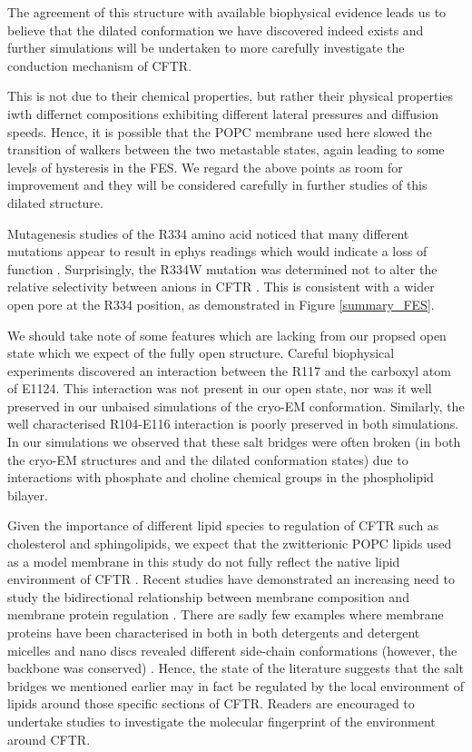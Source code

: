 The agreement of this structure with available biophysical evidence leads us to believe that the dilated conformation we have discovered indeed exists and further simulations will be undertaken to more carefully investigate the conduction mechanism of CFTR. 

This is not due to their chemical properties, but rather their physical properties iwth differnet compositions exhibiting different lateral pressures and diffusion speeds. Hence, it is possible that the POPC membrane used here slowed the transition of walkers between the two metastable states, again leading to some levels of hysteresis in the FES. We regard the above points as room for improvement and they will be considered carefully in further studies of this dilated structure.

Mutagenesis studies of the R334 amino acid noticed that many different mutations appear to result in ephys readings which would indicate a loss of function \cite{ge2004, gong2004, linsdell2021}. Surprisingly, the R334W mutation was determined not to alter the relative selectivity between anions in CFTR \cite{sheppard1993}. This is consistent with a wider open pore at the R334 position, as demonstrated in Figure \ref{summary_FES}.


We should take note of some features which are lacking from our propsed open state which we expect of the fully open structure. Careful biophysical experiments discovered an interaction between the R117 and the carboxyl atom of E1124. This interaction was not present in our open state, nor was it well preserved in our unbaised simulations of the cryo-EM conformation. Similarly, the well characterised R104-E116 interaction is poorly preserved in both simulations. In our simulations we observed that these salt bridges were often broken (in both the cryo-EM structures and and the dilated conformation  states) due to interactions with phosphate and choline chemical groups in the phospholipid bilayer. 

Given the importance of different lipid species to regulation of CFTR such as cholesterol and sphingolipids, we expect that the zwitterionic POPC lipids used as a model membrane in this study do not fully reflect the native lipid environment of CFTR \cite{farinha2018, cottrill2020}. Recent studies have demonstrated an increasing need to study the bidirectional relationship between membrane composition and membrane protein regulation \cite{lin2022, kapoor2021, cui2020}. There are sadly few examples where membrane proteins have been characterised in both in both detergents and detergent micelles and nano discs revealed different side-chain conformations (however, the backbone was conserved) \cite{autzen2019, gao2016, cheng2015}. Hence, the state of the literature suggests that the salt bridges we mentioned earlier may in fact be regulated by the local environment of lipids around those specific sections of CFTR. Readers are encouraged to undertake studies to investigate the molecular fingerprint of the environment around CFTR.


